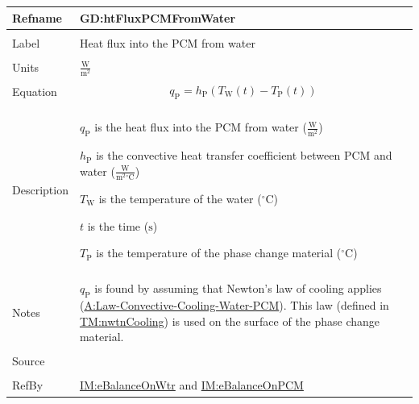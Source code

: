 \documentclass[12pt]{article}
\begin{document}
\vspace{\baselineskip}
\noindent
\begin{minipage}{\textwidth}
\begin{tabular}{>{\raggedright}p{}>{\raggedright\arraybackslash}p{}}
\toprule \textbf{Refname} & \textbf{GD:htFluxPCMFromWater}
\label{GD:htFluxPCMFromWater}
\\ \midrule \\
Label & Heat flux into the PCM from water
        
\\ \midrule \\
Units & $\frac{\text{W}}{\text{m}^{2}}$
        
\\ \midrule \\
Equation & \begin{displaymath}
           {q_{\text{P}}}={h_{\text{P}}} \left({T_{\text{W}}}\left(t\right)-{T_{\text{P}}}\left(t\right)\right)
           \end{displaymath}
\\ \midrule \\
Description & \begin{symbDescription}
              \item{${q_{\text{P}}}$ is the heat flux into the PCM from water ($\frac{\text{W}}{\text{m}^{2}}$)}
              \item{${h_{\text{P}}}$ is the convective heat transfer coefficient between PCM and water ($\frac{\text{W}}{\text{m}^{2}{}^{\circ}\text{C}}$)}
              \item{${T_{\text{W}}}$ is the temperature of the water (${{}^{\circ}\text{C}}$)}
              \item{$t$ is the time (${\text{s}}$)}
              \item{${T_{\text{P}}}$ is the temperature of the phase change material (${{}^{\circ}\text{C}}$)}
              \end{symbDescription}
\\ \midrule \\
Notes & ${q_{\text{P}}}$ is found by assuming that Newton's law of cooling applies (\hyperref[assumpLCCWP]{A:Law-Convective-Cooling-Water-PCM}). This law (defined in \hyperref[TM:nwtnCooling]{TM:nwtnCooling}) is used on the surface of the phase change material.
        
\\ \midrule \\
Source & \cite{koothoor2013}
         
\\ \midrule \\
RefBy & \hyperref[IM:eBalanceOnWtr]{IM:eBalanceOnWtr} and \hyperref[IM:eBalanceOnPCM]{IM:eBalanceOnPCM}
        
\\ \bottomrule
\end{tabular}
\end{minipage}
\end{document}
